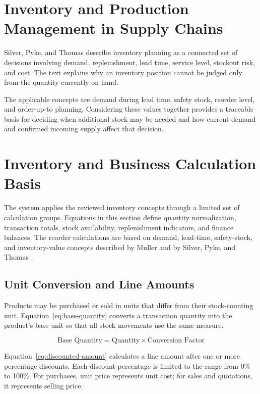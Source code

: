 \section{Inventory and Production Management in Supply Chains \cite{silver2016inventory}}
Silver, Pyke, and Thomas describe inventory planning as a connected set of decisions involving demand, replenishment, lead time, service level, stockout risk, and cost. The text explains why an inventory position cannot be judged only from the quantity currently on hand.

The applicable concepts are demand during lead time, safety stock, reorder level, and order-up-to planning. Considering these values together provides a traceable basis for deciding when additional stock may be needed and how current demand and confirmed incoming supply affect that decision.

\section{Inventory and Business Calculation Basis}
The system applies the reviewed inventory concepts through a limited set of calculation groups. Equations in this section define quantity normalization, transaction totals, stock availability, replenishment indicators, and finance balances. The reorder calculations are based on demand, lead-time, safety-stock, and inventory-value concepts described by Muller and by Silver, Pyke, and Thomas \cite{paper_2,silver2016inventory}.

\subsection{Unit Conversion and Line Amounts}
Products may be purchased or sold in units that differ from their stock-counting unit. Equation~\ref{eq:base-quantity} converts a transaction quantity into the product's base unit so that all stock movements use the same measure.

\begin{equation}
\label{eq:base-quantity}
\text{Base Quantity} = \text{Quantity} \times \text{Conversion Factor}
\end{equation}

Equation~\ref{eq:discounted-amount} calculates a line amount after one or more percentage discounts. Each discount percentage is limited to the range from 0\% to 100\%. For purchases, unit price represents unit cost; for sales and quotations, it represents selling price.

